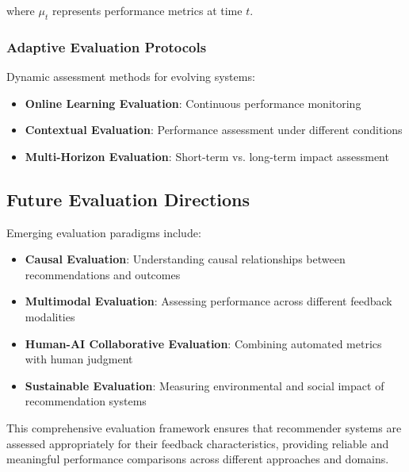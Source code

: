 where $\mu_t$ represents performance metrics at time $t$.

\subsubsection{Adaptive Evaluation Protocols}

Dynamic assessment methods for evolving systems:

\begin{itemize}
    \item \textbf{Online Learning Evaluation}: Continuous performance monitoring
    \item \textbf{Contextual Evaluation}: Performance assessment under different conditions
    \item \textbf{Multi-Horizon Evaluation}: Short-term vs. long-term impact assessment
\end{itemize}

\subsection{Future Evaluation Directions}

Emerging evaluation paradigms include:

\begin{itemize}
    \item \textbf{Causal Evaluation}: Understanding causal relationships between recommendations and outcomes
    \item \textbf{Multimodal Evaluation}: Assessing performance across different feedback modalities
    \item \textbf{Human-AI Collaborative Evaluation}: Combining automated metrics with human judgment
    \item \textbf{Sustainable Evaluation}: Measuring environmental and social impact of recommendation systems
\end{itemize}

This comprehensive evaluation framework ensures that recommender systems are assessed appropriately for their feedback characteristics, providing reliable and meaningful performance comparisons across different approaches and domains.
